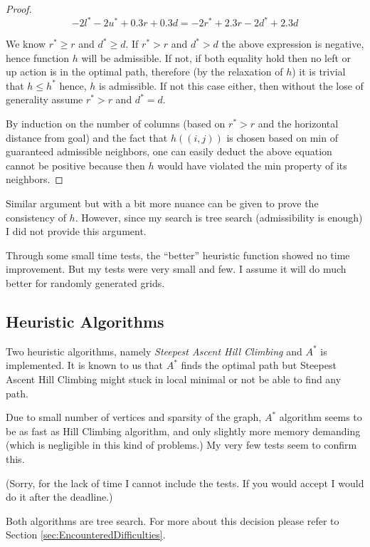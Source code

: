 \documentclass[11pt]{article}
\begin{document}
\begin{proof}
						$$ -2l^* - 2u^* + 0.3r + 0.3d = -2r^* + 2.3r - 2d^* + 2.3d $$
						
					We know $r^* \ge r$ and $d^* \ge d$. If $r^* > r$ and $d^* > d$ the above expression is negative, hence function $h$ will be admissible. If not, if both equality hold then no left or up action is in the optimal path, therefore (by the relaxation of $h$) it is trivial that $h \le h^*$ hence, $h$ is admissible. If not this case either, then without the lose of generality assume $r^* > r$ and $d^* = d$.
					
					By induction on the number of columns (based on $r^* > r$ and the horizontal distance from goal) and the fact that $h( (i, j) )$ is chosen based on min of guaranteed admissible neighbors, one can easily deduct the above equation cannot be positive because then $h$ would have violated the min property of its neighbors.
				\end{proof}
				
				
				Similar argument but with a bit more nuance can be given to prove the consistency of $h$. However, since my search is tree search (admissibility is enough) I did not provide this argument.
				
				Through some small time tests, the ``better'' heuristic function showed no time improvement. But my tests were very small and few. I assume it will do much better for randomly generated grids.
				
		\subsection{Heuristic Algorithms}
			Two heuristic algorithms, namely \emph{Steepest Ascent Hill Climbing} and $A^*$ is implemented. It is known to us that $A^*$ finds the optimal path but Steepest Ascent Hill Climbing might stuck in local minimal or not be able to find any path. \cite{AIBook}
			
			Due to small number of vertices and sparsity of the graph, $A^*$ algorithm seems to be as fast as Hill Climbing algorithm, and only slightly more memory demanding (which is negligible in this kind of problems.) My very few tests seem to confirm this.
			
			(Sorry, for the lack of time I cannot include the tests. If you would accept I would do it after the deadline.)
			
			Both algorithms are tree search. For more about this decision please refer to \textcolor{darkishBlue}{Section} \ref{sec:EncounteredDifficulties}.
			
\end{document}
